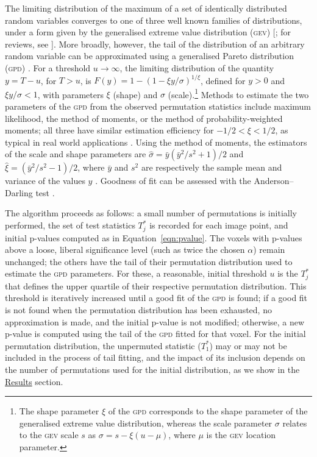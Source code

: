The limiting distribution of the maximum of a set of identically distributed random variables converges to one of three well known families of distributions, under a form given by the generalised extreme value distribution (\textsc{gev}) [\citet{Gnedenko1943}; for reviews, see \citet{Leadbetter1983, Davison2015}]. More broadly, however, the tail of the distribution of an arbitrary random variable can be approximated using a generalised Pareto distribution (\textsc{gpd}) \citep{PicklandsIII1975}. For a threshold $u\rightarrow\infty$, the limiting distribution of the quantity $y=T-u$, for $T>u$, is $F(y) = 1-(1-\xi y/\sigma)^{1/\xi}$, defined for $y>0$ and $\xi y/\sigma<1$, with parameters $\xi$ (shape) and $\sigma$ (scale).\footnote{The shape parameter $\xi$ of the \textsc{gpd} corresponds to the shape parameter of the generalised extreme value distribution, whereas the scale parameter $\sigma$ relates to the \textsc{gev} scale $s$ as $\sigma=s-\xi(u-\mu)$, where $\mu$ is the \textsc{gev} location parameter.} Methods to estimate the two parameters of the \textsc{gpd} from the observed permutation statistics include maximum likelihood, the method of moments, or the method of probability-weighted moments; all three have similar estimation efficiency for $-1/2 < \xi < 1/2$, as typical in real world applications \citep{Hosking1987, Knijnenburg2009}. Using the method of moments, the estimators of the scale and shape parameters are $\hat{\sigma} = \bar{y}(\bar{y}^2/s^2+1)/2$ and $\hat{\xi}=(\bar{y}^2/s^2-1)/2$, where $\bar{y}$ and $s^2$ are respectively the sample mean and variance of the values $y$ \citep{Hosking1987}. Goodness of fit can be assessed with the Anderson--Darling test \citep{Anderson1952, Choulakian2001, Knijnenburg2009}.

The algorithm proceeds as follows: a small number of permutations is initially performed, the set of test statistics $T^*_j$ is recorded for each image point, and initial p-values computed as in Equation~\ref{eqn:pvalue}. The voxels with p-values above a loose, liberal significance level (such as twice the chosen $\alpha$) remain unchanged; the others have the tail of their permutation distribution used to estimate the \textsc{gpd} parameters. For these, a reasonable, initial threshold $u$ is the $T^*_j$ that defines the upper quartile of their respective permutation distribution. This threshold is iteratively increased until a good fit of the \textsc{gpd} is found; if a good fit is not found when the permutation distribution has been exhausted, no approximation is made, and the initial p-value is not modified; otherwise, a new p-value is computed using the tail of the \textsc{gpd} fitted for that voxel. For the initial permutation distribution, the unpermuted statistic ($T^*_1$) may or may not be included in the process of tail fitting, and the impact of its inclusion depends on the number of permutations used for the initial distribution, as we show in the \href{sec:accel:results}{Results} section.

